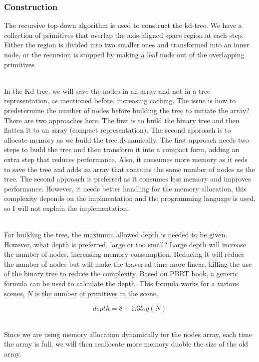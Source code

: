 \documentclass[11pt,a4paper]{article}
\begin{document}
\subsubsection{Construction}

The recursive top-down algorithm is used to construct the kd-tree. We have a collection of primitives that overlap the axis-aligned space region at each step. Either the region is divided into two smaller ones and transformed into an inner node, or the recursion is stopped by making a leaf node out of the overlapping primitives.

\noindent
\\
In the Kd-tree, we will save the nodes in an array and not in a tree representation, as mentioned before, increasing caching. The issue is how to predetermine the number of nodes before building the tree to initiate the array? There are two approaches here. The first is to build the binary tree and then flatten it to an array (compact representation). The second approach is to allocate memory as we build the tree dynamically. The first approach needs two steps to build the tree and then transform it into a compact form, adding an extra step that reduces performance. Also, it consumes more memory as it eeds to save the tree and adds an array that contains the same number of nodes as the tree. The second approach is preferred as it consumes less memory and improves performance. However, it needs better handling for the memory allocation, this complexity depends on the implmentation and the programming language is used, so I will not explain the implementation. 

\noindent
\\
For building the tree, the maximum allowed depth is needed to be given. However, what depth is preferred, large or too small? Large depth will increase the number of nodes, increasing memory consumption. Reducing it will reduce the number of nodes but will make the traversal time more linear, killing the use of the binary tree to reduce the complexity. Based on  PBRT book, a generic formula can be used to calculate the depth. This formula works for a various scenes, $N$ is the number of primitives in the scene. 


\begin{equation}
depth = 8 + 1.3log(N)
\end{equation}

\noindent
\\
Since we are using memory allocation dynamically for the nodes array, each time the array is full, we will then reallocate more memory duoble the size of the old array.
\end{document}
